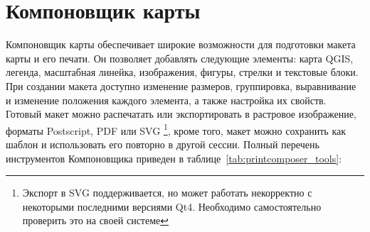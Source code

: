 
\chapter{Компоновщик карты}\label{label_printcomposer}


Компоновщик карты обеспечивает широкие возможности для подготовки
макета карты и его печати. Он позволяет добавлять следующие элементы: карта QGIS, легенда,
масштабная линейка, изображения, фигуры, стрелки и текстовые блоки. При
создании макета доступно изменение размеров, группировка, выравнивание и
изменение положения каждого элемента, а также настройка их свойств.
Готовый макет можно распечатать или экспортировать в растровое изображение,
форматы Postscript, PDF или SVG \footnote{Экспорт в SVG поддерживается,
но может работать некорректно с некоторыми последними версиями Qt4.
Необходимо самостоятельно проверить это на своей системе}, кроме того,
макет можно сохранить как шаблон и использовать его повторно в другой
сессии. Полный перечень инструментов Компоновщика приведен в
таблице~\ref{tab:printcomposer_tools}:

